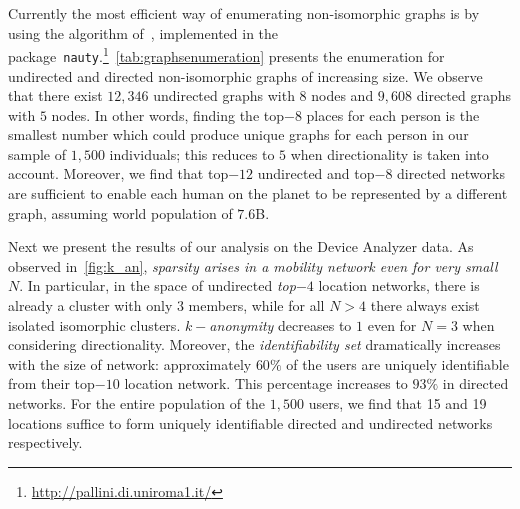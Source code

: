 \begin{table*}[!t]
	\centering
	\caption{Sequences of non-isomorphic graphs for undirected and directed graphs of increasing size.}
	\label{tab:graphsenumeration}
\end{table*}

Currently the most efficient way of enumerating  non-isomorphic graphs is by using the algorithm of~\textcite{McKay}, implemented in the package~\texttt{nauty}.\footnote{\url{http://pallini.di.uniroma1.it/}}~\cref{tab:graphsenumeration} presents the enumeration for undirected and directed non-isomorphic graphs of increasing size. We observe that there exist $12,346$ undirected graphs with $8$ nodes and $9,608$ directed graphs with $5$ nodes. In other words, finding the top$-8$ places for each person is the smallest number which could produce unique graphs for each person in our sample of $1,500$ individuals; this reduces to $5$ when directionality is taken into account. Moreover, we find that top$-12$ undirected and top$-8$ directed networks are sufficient to enable each human on the planet to be represented by a different graph, assuming world population of $7.6$B.

Next we present the results of our analysis on the Device Analyzer data.
As observed in~\cref{fig:k_an}, \emph{sparsity arises in a mobility network even for very small $ N $}.
In particular, in the space of undirected \emph{top$-4$} location networks, there is already a cluster with only $ 3 $ members, while for all $ N > 4 $ there always exist isolated isomorphic clusters.
\emph{$ k-$anonymity} decreases to $ 1 $ even for $ N=3 $ when considering directionality.
Moreover, the \emph{identifiability set} dramatically increases with the size of network: approximately $ 60\% $ of the users are uniquely identifiable from their top$-10$ location network.
This percentage increases to $93\%$ in directed networks.
For the entire population of the $ 1,500 $ users, we find that 15 and 19 locations suffice to form uniquely identifiable directed and undirected networks respectively.

